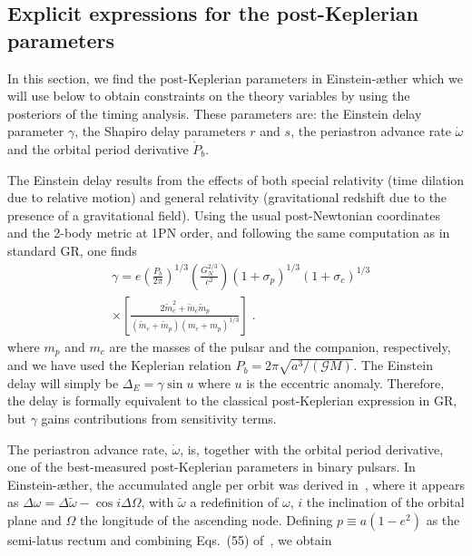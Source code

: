 \documentclass[
    floats,
    floatfix,
    amssymb,
    prd,
    twocolumn,
    superscriptaddress,
    nofootinbib,
    unicode,
    colorlinks=true,
    linktocpage=true
]{revtex4-2}
\begin{document}
\subsection{Explicit expressions for the post-Keplerian parameters}
\label{sec:post-Keplerian}
In this section, we find the post-Keplerian parameters in Einstein-\ae ther which we will use below to obtain constraints on the theory variables by using the posteriors of the timing  analysis. These parameters are: the Einstein delay parameter $\gamma$, the Shapiro delay parameters $r$ and $s$, the periastron advance rate $\dot{\omega}$ and the orbital period derivative $\dot{P}_b$. 

The Einstein delay results from the effects of both special relativity (time dilation due to relative motion) and general relativity (gravitational redshift due to the presence of a gravitational field). Using the usual post-Newtonian coordinates and the 2-body metric at 1PN order, and following the same computation as in standard GR, one finds 
\begin{equation}
\begin{split}
&\gamma =  e \left( \frac{P_b}{2 \pi} \right)^{1/3} \left( \frac{G_N^{2/3}}{c^2} \right) (1+\sigma_p)^{1/3} (1+\sigma_c)^{1/3}  \\
&\times \left[ \frac{2\tilde{m}_c^2 +\tilde{m}_c\tilde{m}_p}{(\tilde{m}_c+\tilde{m}_p)(m_c+m_p)^{1/3}} \right]
 \; .
\end{split}
\end{equation}
where $m_p$ and $m_c$ are the masses of the pulsar and the companion, respectively, and we have used the Keplerian relation $P_b=2\pi\sqrt{a^3/(\mathcal{G}M)}$. The Einstein delay will simply be $\Delta_E= \gamma \sin{u}$ where $u$ is the eccentric anomaly. Therefore, the delay is formally equivalent to the classical post-Keplerian expression in GR, but $\gamma$ gains contributions from sensitivity terms.  


The periastron advance rate, $\dot{\omega}$, is, together with the orbital period derivative, one of the best-measured post-Keplerian parameters in binary pulsars. In Einstein-\ae ther, the accumulated angle per orbit was derived in~\cite{Will_2018}, where it appears as $\Delta \omega = \Delta \tilde{\omega} - \cos{i}\Delta \Omega$, with  $\tilde{\omega}$  a redefinition of $\omega$, $i$ the inclination of the orbital plane and $\Omega$ the longitude
of the ascending node. Defining $p\equiv a(1-e^2)$ as the semi-latus rectum and combining Eqs.~(55) of~\cite{Will_2018}, we obtain  
\end{document}
